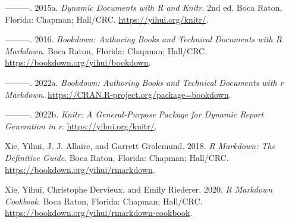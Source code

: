 \documentclass[
]{book}
\newlength{\cslhangindent}
\newlength{\cslentryspacingunit} %
\newenvironment{CSLReferences}[2] %
 {%
  \setlength{\parindent}{0pt}
  \ifodd #1
  \let\oldpar\par
  \def\par{\hangindent=\cslhangindent\oldpar}
  \fi
  \setlength{\parskip}{#2\cslentryspacingunit}
 }%
 {}
\begin{document}
\begin{CSLReferences}{1}{0}
\leavevmode{}%
---------. 2015a. \emph{Dynamic Documents with {R} and Knitr}. 2nd ed. Boca Raton, Florida: Chapman; Hall/CRC. \url{https://yihui.org/knitr/}.

\leavevmode{}%
---------. 2016. \emph{Bookdown: Authoring Books and Technical Documents with {R} Markdown}. Boca Raton, Florida: Chapman; Hall/CRC. \url{https://bookdown.org/yihui/bookdown}.

\leavevmode{}%
---------. 2022a. \emph{Bookdown: Authoring Books and Technical Documents with r Markdown}. \url{https://CRAN.R-project.org/package=bookdown}.

\leavevmode{}%
---------. 2022b. \emph{Knitr: A General-Purpose Package for Dynamic Report Generation in r}. \url{https://yihui.org/knitr/}.

\leavevmode{}%
Xie, Yihui, J. J. Allaire, and Garrett Grolemund. 2018. \emph{R Markdown: The Definitive Guide}. Boca Raton, Florida: Chapman; Hall/CRC. \url{https://bookdown.org/yihui/rmarkdown}.

\leavevmode{}%
Xie, Yihui, Christophe Dervieux, and Emily Riederer. 2020. \emph{R Markdown Cookbook}. Boca Raton, Florida: Chapman; Hall/CRC. \url{https://bookdown.org/yihui/rmarkdown-cookbook}.

\end{CSLReferences}
\end{document}
